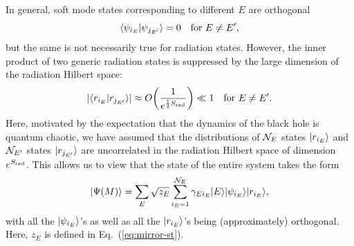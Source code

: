 \documentclass[12pt]{article}
\begin{document}
In general, soft mode states corresponding to different $E$ are 
orthogonal
%
\begin{equation}
  \inner{\psi_{i_E}}{\psi_{j_{E'}}} = 0 
\quad
  \mbox{for } E \neq E',
\label{eq:psi-ortho}
\end{equation}
%
but the same is not necessarily true for radiation states.  However, 
the inner product of two generic radiation states is suppressed 
by the large dimension of the radiation Hilbert space:
%
\begin{equation}
  |\inner{r_{i_E}}{r_{j_{E'}}}| 
  \approx O\biggl(\frac{1}{e^{\frac{1}{2}S_{\rm rad}}}\biggr) \ll 1
\quad
  \mbox{for } E \neq E'.
\label{eq:r-ortho}
\end{equation}
%
Here, motivated by the expectation that the dynamics of the black 
hole is quantum chaotic, we have assumed that the distributions 
of ${\cal N}_E$ states $| r_{i_E} \rangle$ and ${\cal N}_{E'}$ states 
$| r_{j_{E'}} \rangle$ are uncorrelated in the radiation Hilbert space 
of dimension $e^{S_{\rm rad}}$.  This allows us to view that the 
state of the entire system takes the form
%
\begin{equation}
  \ket{\Psi(M)} = \sum_E \sqrt{z_E} 
    \sum_{i_E=1}^{{\cal N}_E} \gamma_{E i_E} 
    \ket{E} \ket{\psi_{i_E}} \ket{r_{i_E}},
\label{eq:GHZ}
\end{equation}
%
with all the $| \psi_{i_E} \rangle$'s as well as all the 
$| r_{i_E} \rangle$'s being (approximately) orthogonal.  Here, $z_E$ 
is defined in Eq.~(\ref{eq:mirror-st}).
\end{document}

